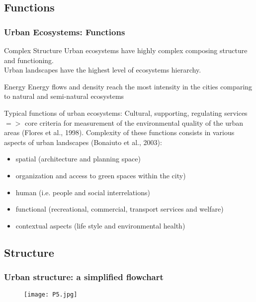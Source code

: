 \documentclass[pdflatex,compress,8pt,
	xcolor={dvipsnames,dvipsnames,svgnames,x11names,table},
	hyperref={	
	breaklinks = true, 
	pdfauthor={Lemenkova Polina}, 
	pdfsubject={Preentation}, 
	pdfcreator={Lemenkova Polina}, 
	pdfproducer={Lemenkova Polina}, 
	colorlinks=true,
	linkcolor=Gold1, 
	citecolor=NavyBlue, 
	urlcolor = NavyBlue, 
	breaklinks = true}]{beamer}
\begin{document}
\subsection{Functions}
\begin{frame}\frametitle{Urban Ecosystems: Functions}

\begin{alertblock}{Complex Structure}
Urban ecosystems have highly complex composing structure and functioning. \\
Urban landscapes have the highest level of ecosystems hierarchy.
\end{alertblock}

\begin{block}{Energy}
Energy flows and density reach the most intensity in the cities comparing to natural and semi-natural ecosystems
\end{block}

\begin{examples}{Typical functions of urban ecosystems:}
Cultural, supporting, regulating services $=>$ core criteria for measurement of the environmental quality of the urban areas (Flores et al., 1998). Complexity of these functions consists in various aspects of urban landscapes (Bonaiuto et al., 2003): 
\begin{itemize}
	\item spatial (architecture and planning space)
	\item organization and access to green spaces within the city)
	\item human (i.e. people and social interrelations)
	\item functional (recreational, commercial, transport services and welfare)
	\item contextual aspects (life style and environmental health)
\end{itemize}
\end{examples}
\end{frame}

\subsection{Structure}
\begin{frame}\frametitle{Urban structure: a simplified flowchart}
\begin{figure}[H]
	\centering
		\texttt{[image: P5.jpg]}
\end{figure}
\end{frame}
\end{document}
